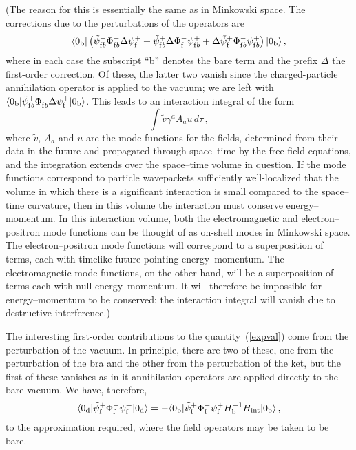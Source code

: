 \documentclass[12pt]{article}
\begin{document}
(The reason for this is essentially the same as in Minkowski space.
The corrections due to the perturbations of the operators are
\begin{equation}
\langle 0_{\rm b}| \left({\tilde\psi}^+_{{\rm f}b}\Phi
^-_{{\rm f}b}\Delta\psi ^+_{\rm f}+{\tilde\psi}^+_{{\rm f}b}\Delta\Phi
^-_{\rm f}\psi ^+_{{\rm f}b}+\Delta {\tilde\psi}^+_{\rm f}\Phi
^-_{{\rm f}b}\psi ^+_{{\rm f}b} \right) |0_{\rm b}\rangle\, ,
\end{equation}
where in each case the subscript ``b'' denotes the bare term and the
prefix $\Delta$ the first-order correction.  Of these, the latter two
vanish since the charged-particle annihilation operator is applied to
the vacuum; we are left with
$\langle 0_{\rm b}| {\tilde\psi}^+_{{\rm f}b}\Phi
^-_{{\rm f}b}\Delta\psi ^+_{\rm f}
|0_{\rm b}\rangle$.
This leads to an interaction integral of the form
\begin{equation}
  \int \tilde v \gamma ^aA_a u\, d\tau\, ,
\end{equation}
where $\tilde v$, $A_a$ and $u$ are the mode functions for the fields,
determined from their data in the future and propagated through
space--time by the free field equations,
and the integration extends over the space--time volume in question.
If the mode functions correspond to particle wavepackets sufficiently
well-localized that the volume in which there is a significant
interaction is small compared to the space--time curvature, then in
this volume the interaction must conserve energy--momentum. 
In this interaction volume, both the electromagnetic and
electron--positron mode functions can be thought of as on-shell modes
in Minkowski space.  The electron--positron mode functions will
correspond to a superposition of terms, each with timelike
future-pointing energy--momentum.  The electromagnetic mode functions,
on the other hand, will be a superposition of terms each with null
energy--momentum.  It will therefore be impossible for
energy--momentum to be conserved:  the interaction integral will
vanish due to destructive interference.)


The interesting first-order contributions to the quantity~(\ref{expval}) come
from the perturbation of the vacuum.  In principle, there are two of these, one
from the perturbation of the bra and the other from the perturbation of the
ket, but the first of these vanishes as in it annihilation operators are
applied directly to the bare vacuum.  We have, therefore, 
\begin{equation}
\langle 0_{\rm d}|{\tilde\psi}^+_{\rm f}\Phi
^-_{\rm f}\psi ^+_{\rm f}|0_{\rm d}\rangle =
-\langle 0_{\rm b}|{\tilde\psi}^+_{\rm f}\Phi
^-_{\rm f}\psi ^+_{\rm f}H_{\rm b}^{-1}H_{\rm int}|0_{\rm b}\rangle\,
,
\end{equation}
to the approximation required, where the field operators may be taken
to be bare.
\end{document}
